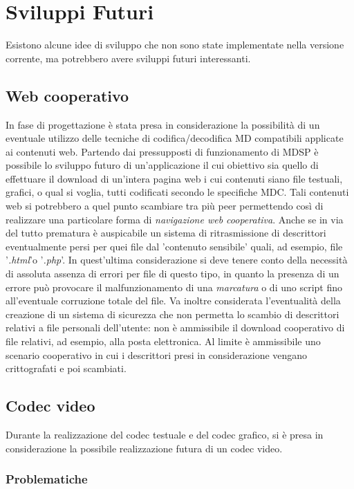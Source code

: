 \chapter{Sviluppi Futuri}
\label{cap:sviluppi_futuri}
Esistono alcune idee di sviluppo che non sono state implementate nella versione
corrente, ma potrebbero avere sviluppi futuri interessanti.


\section{Web cooperativo}
In fase di progettazione è stata presa in considerazione la possibilità di un
eventuale utilizzo delle tecniche di codifica/decodifica MD compatibili
applicate ai contenuti web. Partendo dai pressupposti di funzionamento di MDSP
è possibile lo sviluppo futuro di un'applicazione il cui obiettivo sia quello
di effettuare il download di un'intera pagina web i cui contenuti siano file
testuali, grafici, o qual si voglia, tutti codificati secondo le specifiche MDC.
Tali contenuti web si potrebbero a quel punto scambiare tra più peer
permettendo così di realizzare una particolare forma di \emph{navigazione web
cooperativa}. Anche se in via del tutto prematura è auspicabile un sistema di ritrasmissione di descrittori eventualmente persi per quei file dal
'contenuto sensibile' quali, ad esempio, file '\emph{.html}'o '\emph{.php}'. In
quest'ultima considerazione si deve tenere conto della necessità di assoluta
assenza di errori per file di questo tipo, in quanto la presenza di un errore
può provocare il malfunzionamento di una \emph{marcatura} o di uno script fino
all'eventuale corruzione totale del file. Va inoltre considerata l'eventualità
della creazione di un sistema di sicurezza che non permetta lo scambio di
descrittori relativi a file personali dell'utente: non è ammissibile il
download cooperativo di file relativi, ad esempio, alla posta elettronica. Al
limite è ammissibile uno scenario cooperativo in cui i descrittori presi in
considerazione vengano crittografati e poi scambiati.

\section{Codec video}
\label{cap:codec_video}
Durante la realizzazione del codec testuale e del codec grafico, si è presa in
considerazione la possibile realizzazione futura di un codec video.

\subsection{Problematiche}

